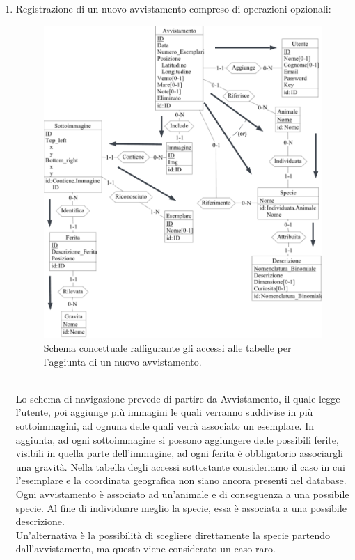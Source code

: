 \documentclass[a4paper,final,12pt]{report}
\begin{document}
\begin{enumerate}
\newpage
\item Registrazione di un nuovo avvistamento compreso di operazioni opzionali:
\begin{figure}[hbtp]
\centering
\includegraphics[scale=0.20]{img_concettuale/Avvistamento_accessi.png}
\caption{Schema concettuale raffigurante gli accessi alle tabelle per l'aggiunta di un nuovo avvistamento.}
\end{figure}\\
Lo schema di navigazione prevede di partire da Avvistamento, il quale legge l'utente, poi aggiunge più immagini le quali verranno suddivise in più sottoimmagini, ad ognuna delle quali verrà associato un esemplare. In aggiunta, ad ogni sottoimmagine si possono aggiungere delle possibili ferite, visibili in quella parte dell'immagine, ad ogni ferita è obbligatorio associargli una gravità. Nella tabella degli accessi sottostante consideriamo il caso in cui l'esemplare e la coordinata geografica non siano ancora presenti nel database. Ogni avvistamento è associato ad un'animale e di conseguenza a una possibile specie. Al fine di individuare meglio la specie, essa è associata a una possibile descrizione.\\ Un'alternativa è la possibilità di scegliere direttamente la specie partendo dall'avvistamento, ma questo viene considerato un caso raro.

\end{enumerate}
\end{document}
